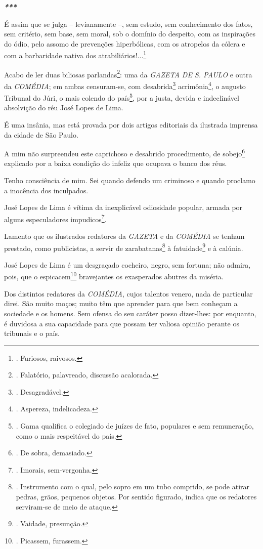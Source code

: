 \emph{\textbf{***}}

É assim que se julga -- levianamente --, sem estudo, sem conhecimento
dos fatos, sem critério, sem base, sem moral, sob o domínio do despeito,
com as inspirações do ódio, pelo assomo de prevenções hiperbólicas, com
os atropelos da cólera e com a barbaridade nativa dos
atrabiliários!...\footnote{. Furiosos, raivosos.}

Acabo de ler duas biliosas parlandas\footnote{. Falatório, palavreado,
  discussão acalorada.}: uma da \emph{GAZETA DE S. PAULO} e outra da
\emph{COMÉDIA}; em ambas censuram-se, com desabrida\footnote{.
  Desagradável.} acrimônia\footnote{. Aspereza, indelicadeza.}, o
augusto Tribunal do Júri, o mais colendo do país\footnote{. Gama
  qualifica o colegiado de juízes de fato, populares e sem remuneração,
  como o mais respeitável do país.}, por a justa, devida e indeclinável
absolvição do réu José Lopes de Lima.

É uma insânia, mas está provada por dois artigos editoriais da ilustrada
imprensa da cidade de São Paulo.

A mim não surpreendeu este caprichoso e desabrido procedimento, de
sobejo\footnote{. De sobra, demasiado.} explicado por a baixa condição
do infeliz que ocupava o banco dos réus.

Tenho consciência de mim. Sei quando defendo um criminoso e quando
proclamo a inocência dos inculpados.

José Lopes de Lima é vítima da inexplicável odiosidade popular, armada
por alguns especuladores impudicos\footnote{. Imorais, sem-vergonha.}.

Lamento que os ilustrados redatores da \emph{GAZETA} e da \emph{COMÉDIA}
se tenham prestado, como publicistas, a servir de zarabatanas\footnote{.
  Instrumento com o qual, pelo sopro em um tubo comprido, se pode atirar
  pedras, grãos, pequenos objetos. Por sentido figurado, indica que os
  redatores serviram-se de meio de ataque.} à fatuidade\footnote{.
  Vaidade, presunção.} e à calúnia.

José Lopes de Lima é um desgraçado cocheiro, negro, sem fortuna; não
admira, pois, que o espicacem\footnote{. Picassem, furassem.}
bravejantes os exasperados abutres da miséria.

Dos distintos redatores da \emph{COMÉDIA}, cujos talentos venero, nada
de particular direi. São muito moços; muito têm que aprender para que
bem conheçam a sociedade e os homens. Sem ofensa do seu caráter posso
dizer-lhes: por enquanto, é duvidosa a sua capacidade para que possam
ter valiosa opinião perante os tribunais e o país.

